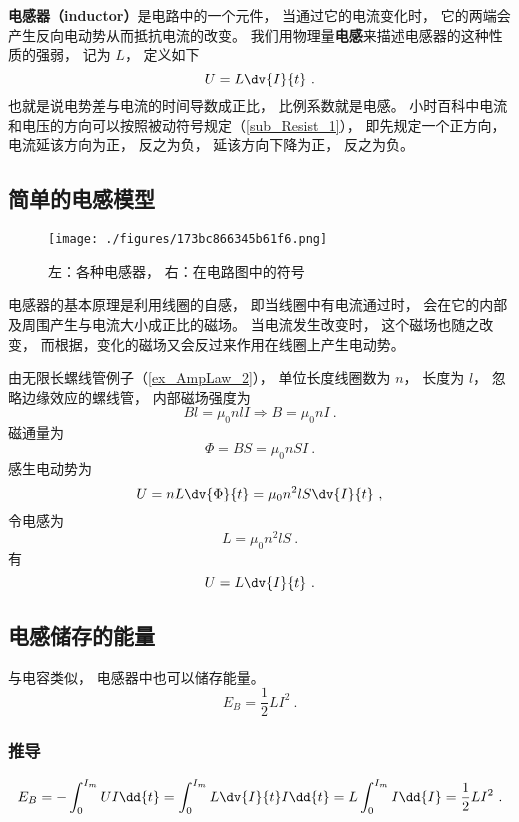 
\begin{issues}
\issueAbstract
\end{issues}


\textbf{电感器（inductor）}是电路中的一个元件， 当通过它的电流变化时， 它的两端会产生反向电动势从而抵抗电流的改变。 我们用物理量\textbf{电感}来描述电感器的这种性质的强弱， 记为 $L$， 定义如下
\begin{equation}\label{eq_Induct_3}
U = L\dv{I}{t}~.
\end{equation}
也就是说电势差与电流的时间导数成正比， 比例系数就是电感。 小时百科中电流和电压的方向可以按照被动符号规定（\autoref{sub_Resist_1}）， 即先规定一个正方向， 电流延该方向为正， 反之为负， 延该方向下降为正， 反之为负。

\subsection{简单的电感模型}

\begin{figure}[ht]
\centering
\texttt{[image: ./figures/173bc866345b61f6.png]}
\caption{左：各种电感器， 右：在电路图中的符号} \label{fig_Induct_1}
\end{figure}
电感器的基本原理是利用线圈的自感， 即当线圈中有电流通过时， 会在它的内部及周围产生与电流大小成正比的磁场。 当电流发生改变时， 这个磁场也随之改变， 而根据，变化的磁场又会反过来作用在线圈上产生电动势。

由无限长螺线管例子（\autoref{ex_AmpLaw_2}）， 单位长度线圈数为 $n$， 长度为 $l$， 忽略边缘效应的螺线管， 内部磁场强度为
\begin{equation}
Bl = \mu_0nlI \Rightarrow B = \mu_0nI~.
\end{equation}
磁通量为
\begin{equation}
\Phi = BS = \mu_0nSI~.
\end{equation}
感生电动势为
\begin{equation}
U = nL\dv{\Phi}{t} = \mu_0n^2lS \dv{I}{t}~,
\end{equation}
令电感为
\begin{equation}\label{eq_Induct_1}
L = \mu_0n^2lS~.
\end{equation}
有
\begin{equation}\label{eq_Induct_2}
U = L\dv{I}{t}~.
\end{equation}

\subsection{电感储存的能量}
与电容类似， 电感器中也可以储存能量。
\begin{equation}
E_B = \frac{1}{2}L I^2~.
\end{equation}

\subsubsection{推导}
\begin{equation}
E_B = -\int_0^{I_m} U I \dd{t} = \int_0^{I_m} L \dv{I}{t} I \dd{t} = L\int_0^{I_m} I \dd{I} = \frac{1}{2} L I^2~.
\end{equation}
